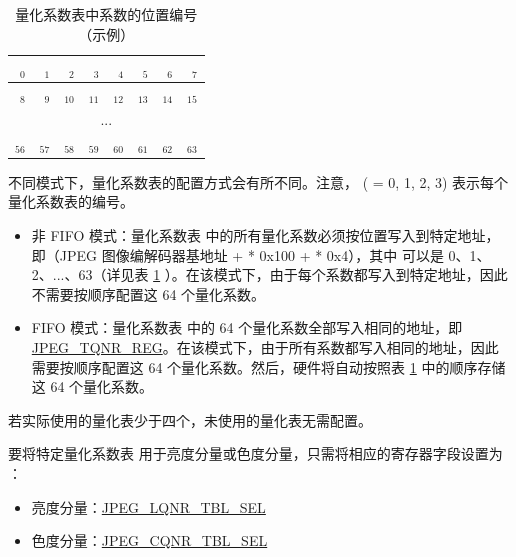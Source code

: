 \documentclass[main\_\_CN.tex]{subfiles}
\begin{document}
\begin{longtable}{ | r | r | r | r | r | r | r | r | }
\caption{量化系数表中系数的位置编号（示例）} \label{tab:example_qnr}
\\ \hline
 $_{\mathrm{0}}$ & $_{\mathrm{1}}$ & $_{\mathrm{2}}$ & $_{\mathrm{3}}$ & $_{\mathrm{4}}$ & $_{\mathrm{5}}$ & $_{\mathrm{6}}$ & $_{\mathrm{7}}$ \\ \hline
 $_{\mathrm{8}}$ & $_{\mathrm{9}}$ & $_{\mathrm{10}}$ & $_{\mathrm{11}}$ & $_{\mathrm{12}}$ & $_{\mathrm{13}}$ & $_{\mathrm{14}}$ & $_{\mathrm{15}}$ \\ \hline
 \multicolumn{8}{c}{...} \\ \hline
 $_{\mathrm{56}}$ & $_{\mathrm{57}}$ & $_{\mathrm{58}}$ & $_{\mathrm{59}}$ & $_{\mathrm{60}}$ & $_{\mathrm{61}}$ & $_{\mathrm{62}}$ & $_{\mathrm{63}}$ \\ \hline
\end{longtable}

不同模式下，量化系数表的配置方式会有所不同。注意， ( = 0, 1, 2, 3) 表示每个量化系数表的编号。
\begin{itemize}
    \item 非 FIFO 模式：量化系数表  中的所有量化系数必须按位置写入到特定地址，即（JPEG 图像编解码器基地址 +  * 0x100 +  * 0x4），其中  可以是 0、1、2、...、63（详见表 \ref{tab:example_qnr} \textit{}）。在该模式下，由于每个系数都写入到特定地址，因此不需要按顺序配置这 64 个量化系数。
    \item FIFO 模式：量化系数表  中的 64 个量化系数全部写入相同的地址，即 \hyperref[regdesc:JPEGT0QNRREG]{JPEG\_TQNR\_REG}。在该模式下，由于所有系数都写入相同的地址，因此需要按顺序配置这 64 个量化系数。然后，硬件将自动按照表 \ref{tab:example_qnr} \textit{} 中的顺序存储这 64 个量化系数。
\end{itemize}

若实际使用的量化表少于四个，未使用的量化表无需配置。

要将特定量化系数表  用于亮度分量或色度分量，只需将相应的寄存器字段设置为 ：
\begin{itemize}
\item 亮度分量：\hyperref[fielddesc:JPEGLQNRTBLSEL]{JPEG\_LQNR\_TBL\_SEL}
\item 色度分量：\hyperref[fielddesc:JPEGCQNRTBLSEL]{JPEG\_CQNR\_TBL\_SEL}
\end{itemize}
\end{document}
